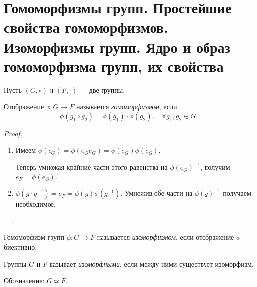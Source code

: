 \section{Гомоморфизмы групп. Простейшие свойства гомоморфизмов. Изоморфизмы групп. Ядро и образ гомоморфизма групп, их свойства}

\begin{definition}
    Пусть $(G, \circ)$ и $(F, \cdot)$ --- две группы.

    Отображение $\phi \colon G \to F$ называется \textit{гомоморфизмом}, если
    \begin{equation*}
        \phi(g_1 \circ g_2) = \phi(g_1) \cdot \phi(g_2), \quad \forall g_1, g_2 \in G
    .\end{equation*}
\end{definition}

\begin{comment}
    Пусть $\phi \colon G \to F$ --- гомоморфизм групп, и пусть $e_G$ и $e_F$ --- нейтральные элементы группы $G$ и $F$ соответственно. Тогда:
    \begin{enumerate}[nosep]
        \item $\phi(e_G) = e_F$.
        \item $\phi(a^{-1}) = \phi(a)^{-1}$ для любого $a \in G$.
    \end{enumerate}
\end{comment}

\begin{proof}~
    \begin{enumerate}
        \item Имеем $\phi(e_G) = \phi(e_G e_G) = \phi(e_G) \phi(e_G)$. 

            Теперь умножая крайние части этого равенства на $\phi(e_G)^{-1}$, получим $e_F = \phi(e_G)$.

        \item $\phi(g \cdot g^{-1}) = e_F = \phi(g) \phi(g^{-1})$. Умножив обе части на $\phi(g)^{-1}$ получаем необходимое.
            \qedhere
    \end{enumerate}
\end{proof}

\begin{definition}
    Гомоморфизм групп $\phi \colon G \to F$ называется \textit{изоморфизмом}, если отображение $\phi$ биективно.
\end{definition}

\begin{definition}
    Группы $G$ и $F$ называет \textit{изоморфными}, если между ними существует изоморфизм.

    Обозначение: $G \simeq F$.
\end{definition}

